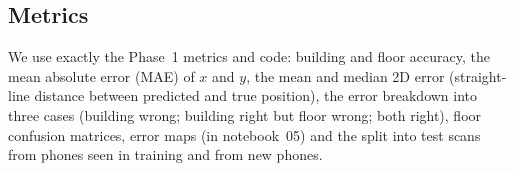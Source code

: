 \subsection{Metrics}\label{sec:metrics}
We use exactly the Phase~1 metrics and code: building and floor accuracy, the
mean absolute error (MAE) of $x$ and $y$, the mean and median 2D error
(straight-line distance between predicted and true position), the error
breakdown into three cases (building wrong; building right but floor wrong;
both right), floor confusion matrices, error maps (in notebook~05) and the
split into test scans from phones seen in training and from new phones.

